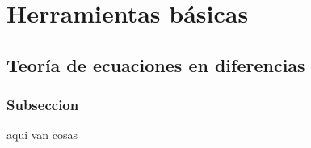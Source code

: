 
\chapter{Herramientas básicas}

\section{Teoría de ecuaciones en diferencias}

\subsection{Subseccion}

aqui van cosas